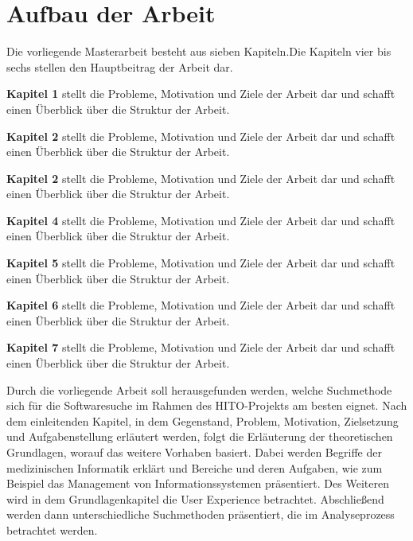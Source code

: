 \section{Aufbau der Arbeit}\label{sec:aufbau}

Die vorliegende Masterarbeit besteht aus sieben Kapiteln.Die Kapiteln vier bis sechs stellen den Hauptbeitrag der Arbeit dar. \newline

\textbf{Kapitel 1} stellt die Probleme, Motivation und Ziele der Arbeit dar und schafft einen Überblick über die Struktur der Arbeit. \newline

\textbf{Kapitel 2} stellt die Probleme, Motivation und Ziele der Arbeit dar und schafft einen Überblick über die Struktur der Arbeit. \newline

\textbf{Kapitel 2} stellt die Probleme, Motivation und Ziele der Arbeit dar und schafft einen Überblick über die Struktur der Arbeit. \newline

\textbf{Kapitel 4} stellt die Probleme, Motivation und Ziele der Arbeit dar und schafft einen Überblick über die Struktur der Arbeit. \newline

\textbf{Kapitel 5} stellt die Probleme, Motivation und Ziele der Arbeit dar und schafft einen Überblick über die Struktur der Arbeit. \newline

\textbf{Kapitel 6} stellt die Probleme, Motivation und Ziele der Arbeit dar und schafft einen Überblick über die Struktur der Arbeit. \newline

\textbf{Kapitel 7} stellt die Probleme, Motivation und Ziele der Arbeit dar und schafft einen Überblick über die Struktur der Arbeit. \newline

Durch die vorliegende Arbeit soll herausgefunden werden, welche Suchmethode sich für die Softwaresuche im Rahmen des HITO-Projekts am besten eignet. Nach dem einleitenden Kapitel, in dem Gegenstand, Problem, Motivation, Zielsetzung und Aufgabenstellung erläutert werden, folgt die Erläuterung der theoretischen Grundlagen, worauf das weitere Vorhaben basiert. Dabei werden Begriffe der medizinischen Informatik erklärt und Bereiche und deren Aufgaben, wie zum Beispiel das Management von Informationssystemen präsentiert. Des Weiteren wird in dem Grundlagenkapitel die User Experience betrachtet. Abschließend werden dann unterschiedliche Suchmethoden präsentiert, die im Analyseprozess betrachtet werden.

